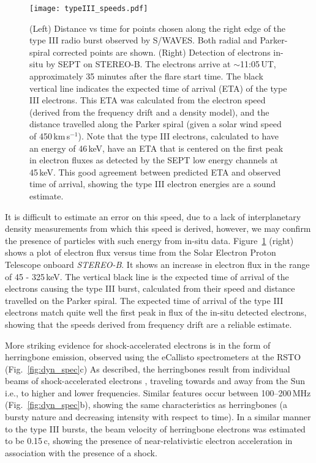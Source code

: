 \begin{figure}[!t]
	\begin{center}
		\texttt{[image: typeIII\_speeds.pdf]}
		\caption[Type III speeds]{(Left) Distance vs time for points chosen along the right edge of the type III radio burst observed by S/WAVES. Both radial and Parker-spiral corrected points are shown. (Right) Detection of electrons in-situ by SEPT on STEREO-B. The electrons arrive at $\sim$11:05\,UT, approximately 35 minutes after the flare start time. The black vertical line indicates the expected time of arrival (ETA) of the type III electrons. This ETA was calculated from the electron speed (derived from the frequency drift and a density model), and the distance travelled along the Parker spiral (given a solar wind speed of 450\,km\,s$^{-1}$). Note that the type III electrons, calculated to have an energy of 46\,keV, have an ETA that is centered on the first peak in electron fluxes as detected by the SEPT low energy channels at 45\,keV. This good agreement between predicted ETA and observed time of arrival, showing the type III electron energies are a sound estimate.}
		\label{fig:typeIII_speeds}
	\end{center}
\end{figure}

It is difficult to estimate an error on this speed, due to a lack of interplanetary density measurements from which this speed is derived, however, we may confirm the presence of particles with such energy from in-situ data. Figure~\ref{fig:typeIII_speeds} (right) shows a plot of electron flux versus time from the Solar Electron Proton Telescope \citep[SEPT;][]{muller2008} onboard \emph{STEREO-B}. It shows an increase in electron flux in the range of 45 - 325\,keV. The vertical black line is the expected time of arrival of the electrons causing the type III burst, calculated from their speed and distance travelled on the Parker spiral. The expected time of arrival of the type III electrons match quite well the first peak in flux of the in-situ detected electrons, showing that the speeds derived from frequency drift are a reliable estimate. 

More striking evidence for shock-accelerated electrons is in the form of herringbone emission, observed using the eCallisto spectrometers at the RSTO (Fig.~\ref{fig:dyn_spec}c)
As described, the herringbones result from individual beams of shock-accelerated electrons \citep{mann2005}, traveling towards and away from the Sun  i.e., to higher and lower frequencies. Similar features occur between 100--200\,MHz (Fig.~\ref{fig:dyn_spec}b), showing the same characteristics as herringbones (a bursty nature and decreasing intensity with respect to time). In a similar manner to the type III bursts, the beam velocity of herringbone electrons was estimated to be 0.15\,c, showing the presence of near-relativistic electron acceleration in association with the presence of a shock. 



